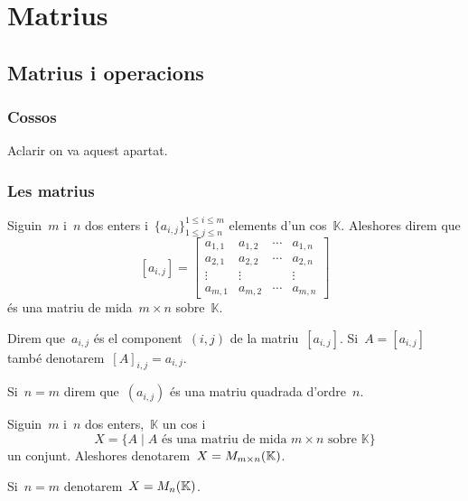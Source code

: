 \documentclass[../algebra-lineal.tex]{subfiles}
\begin{document}
\chapter{Matrius}
\section{Matrius i operacions}
    \subsection{Cossos}
    \begin{definition}[Cos]
        \label{def:cos}
        Aclarir on va aquest apartat.
    \end{definition}
    \subsection{Les matrius}
    \begin{definition}[Matriu]
        \label{def:matriu}
        \label{def:matriu-quadrada}
        Siguin~\(m\) i~\(n\) dos enters i~\(\{a_{i,j}\}^{1\leq i\leq m}_{1\leq j\leq n}\) elements d'un cos~\(\mathbb{K}\).
        Aleshores direm que
        \[[a_{i,j}]=
        \left[\begin{matrix}
        a_{1,1} & a_{1,2} & \cdots & a_{1,n} \\
        a_{2,1} & a_{2,2} & \cdots & a_{2,n} \\
        \vdots & \vdots &  & \vdots \\
        a_{m,1} & a_{m,2} & \cdots & a_{m,n}
        \end{matrix}\right]\]
        és una matriu de mida~\(m\times n\) sobre~\(\mathbb{K}\).

        Direm que~\(a_{i,j}\) és el component~\((i,j)\) de la matriu~\([a_{i,j}]\).
        Si~\(A=[a_{i,j}]\) també denotarem~\([A]_{i,j}=a_{i,j}\).

        Si~\(n=m\) direm que~\((a_{i,j})\) és una matriu quadrada d'ordre~\(n\).
    \end{definition}
    \begin{notation}
        \label{notation:conjunt-de-matrius}
        Siguin~\(m\) i~\(n\) dos enters,~\(\mathbb{K}\) un cos i
        \[
            X=\{A\mid A\text{ és una matriu de mida }m\times n\text{ sobre }\mathbb{K}\}
        \]
        un conjunt.
        Aleshores denotarem~\(X=M_{m\times n}(\mathbb{K})\).

        Si~\(n=m\) denotarem~\(X=M_{n}(\mathbb{K})\).
    \end{notation}
\end{document}

